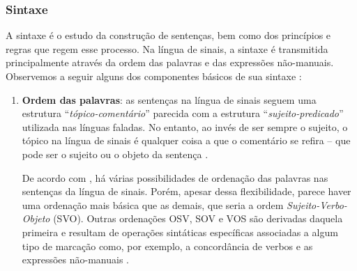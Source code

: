 \subsubsection{Sintaxe}
\label{sec:linguistica-sintaxe}

A sintaxe é o estudo da construção de sentenças, bem como dos princípios e regras que regem esse processo. Na língua de sinais, a sintaxe é transmitida principalmente através da ordem das palavras e das expressões não-manuais.
Observemos a seguir alguns dos componentes básicos de sua sintaxe \cite{jay-2011-dont-just-sign,hill-2019-sign-languages,quadros-2004-estudos-linguisticos}:

\begin{enumerate}
    \item \textbf{Ordem das palavras}: as sentenças na língua de sinais seguem uma estrutura ``\textit{tópico-comentário}'' parecida com a estrutura ``\textit{sujeito-predicado}'' utilizada nas línguas faladas. No entanto, ao invés de ser sempre o sujeito, o tópico na língua de sinais é qualquer coisa a que o comentário se refira -- que pode ser o sujeito ou o objeto da sentença \cite{jay-2011-dont-just-sign}. 
    
    De acordo com , há várias possibilidades de ordenação das palavras nas sentenças da língua de sinais. Porém, apesar dessa flexibilidade, parece haver uma ordenação mais básica que as demais, que seria a ordem \textit{Sujeito-Verbo-Objeto} (SVO). 
    Outras ordenações OSV, SOV e VOS são derivadas daquela primeira e resultam de operações sintáticas específicas  associadas a algum tipo de marcação como, por exemplo, a concordância de verbos e as expressões não-manuais \cite{quadros-2004-estudos-linguisticos}. 
    
    




\end{enumerate}
